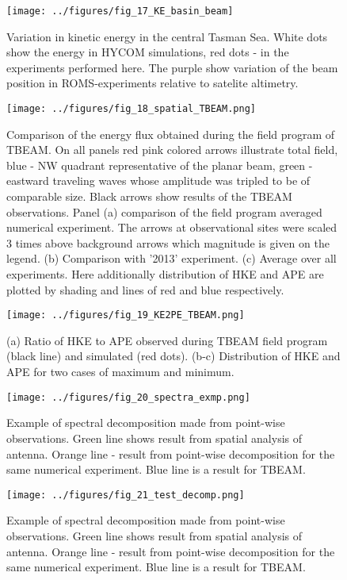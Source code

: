 \documentclass[12pt]{article}
\begin{document}
\begin{figure}
\centering
\texttt{[image: ../figures/fig\_17\_KE\_basin\_beam]}
\caption{Variation in kinetic energy in the central Tasman Sea. White dots show the energy in HYCOM 
simulations, red dots - in the experiments performed here. The purple show variation of the beam 
position in ROMS-experiments relative to satelite altimetry. }
\label{C3.fig:KE_beam}
\end{figure}

\begin{figure}
	\centering
	\texttt{[image: ../figures/fig\_18\_spatial\_TBEAM.png]}
	\caption{Comparison of the energy flux obtained during the field program of TBEAM. On all 
	panels red pink colored arrows illustrate total field, blue - NW quadrant representative of the 
	planar beam, green - eastward traveling waves whose amplitude was tripled to be of comparable 
	size. Black arrows show results of the TBEAM observations. Panel (a) comparison of the field 
	program averaged numerical experiment. The arrows at observational sites were scaled 3 times 
	above background arrows which magnitude is given on the legend. (b) Comparison with '2013' 
	experiment. (c) Average over all experiments. Here additionally distribution of HKE and APE are 
	plotted by shading and lines of red and blue respectively.}
	\label{C3.fig:TBEAM_sp}
\end{figure}

\begin{figure}
	\centering
	\texttt{[image: ../figures/fig\_19\_KE2PE\_TBEAM.png]}
	\caption{(a) Ratio of HKE to APE observed during TBEAM field program (black line) and simulated 
	(red dots). (b-c) Distribution of HKE and APE for two cases of maximum and minimum.}
	\label{C3.fig:TBEAM_KE2PE}
\end{figure}

\begin{figure}
	\centering
	\texttt{[image: ../figures/fig\_20\_spectra\_exmp.png]}
	\caption{Example of spectral decomposition made from point-wise observations. Green line shows 
	result from spatial analysis of antenna. Orange line - result from point-wise decomposition for 
	the same numerical experiment. Blue line is a result for TBEAM.}
	\label{C3.fig:ex_spectra}
\end{figure}

\begin{figure}
	\centering
	\texttt{[image: ../figures/fig\_21\_test\_decomp.png]}
	\caption{Example of spectral decomposition made from point-wise observations. Green line shows 
		result from spatial analysis of antenna. Orange line - result from point-wise decomposition 
		for 
		the same numerical experiment. Blue line is a result for TBEAM.}
	\label{C3.fig:test_spectra}
\end{figure}
\end{document}
